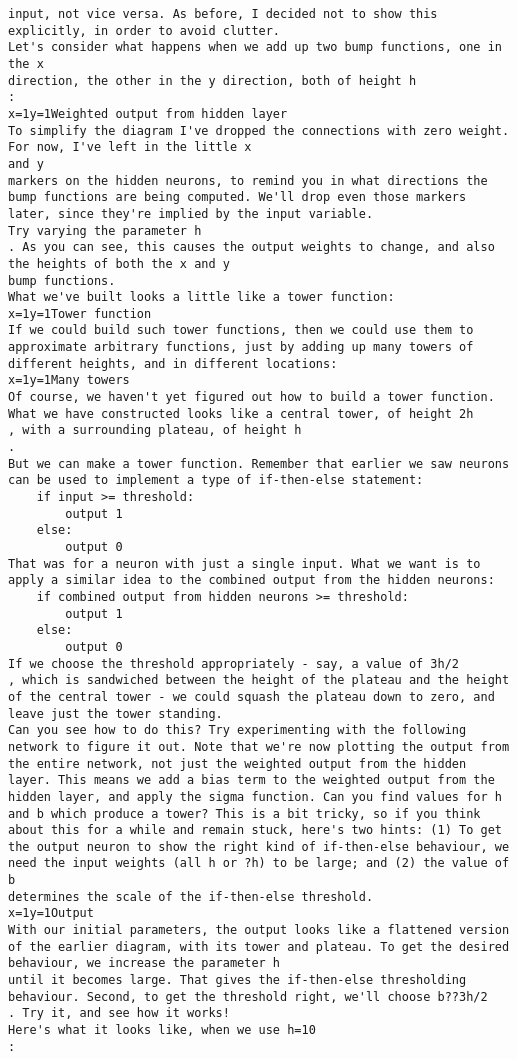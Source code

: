 \begin{lstlisting}
input, not vice versa. As before, I decided not to show this explicitly, in order to avoid clutter.
Let's consider what happens when we add up two bump functions, one in the x
direction, the other in the y direction, both of height h
:
x=1y=1Weighted output from hidden layer
To simplify the diagram I've dropped the connections with zero weight. For now, I've left in the little x
and y
markers on the hidden neurons, to remind you in what directions the bump functions are being computed. We'll drop even those markers later, since they're implied by the input variable.
Try varying the parameter h
. As you can see, this causes the output weights to change, and also the heights of both the x and y
bump functions.
What we've built looks a little like a tower function:
x=1y=1Tower function 
If we could build such tower functions, then we could use them to approximate arbitrary functions, just by adding up many towers of different heights, and in different locations:
x=1y=1Many towers 
Of course, we haven't yet figured out how to build a tower function. What we have constructed looks like a central tower, of height 2h
, with a surrounding plateau, of height h
.
But we can make a tower function. Remember that earlier we saw neurons can be used to implement a type of if-then-else statement:
    if input >= threshold: 
        output 1
    else:
        output 0
That was for a neuron with just a single input. What we want is to apply a similar idea to the combined output from the hidden neurons:
    if combined output from hidden neurons >= threshold:
        output 1
    else:
        output 0
If we choose the threshold appropriately - say, a value of 3h/2
, which is sandwiched between the height of the plateau and the height of the central tower - we could squash the plateau down to zero, and leave just the tower standing.
Can you see how to do this? Try experimenting with the following network to figure it out. Note that we're now plotting the output from the entire network, not just the weighted output from the hidden layer. This means we add a bias term to the weighted output from the hidden layer, and apply the sigma function. Can you find values for h
and b which produce a tower? This is a bit tricky, so if you think about this for a while and remain stuck, here's two hints: (1) To get the output neuron to show the right kind of if-then-else behaviour, we need the input weights (all h or ?h) to be large; and (2) the value of b
determines the scale of the if-then-else threshold.
x=1y=1Output
With our initial parameters, the output looks like a flattened version of the earlier diagram, with its tower and plateau. To get the desired behaviour, we increase the parameter h
until it becomes large. That gives the if-then-else thresholding behaviour. Second, to get the threshold right, we'll choose b??3h/2
. Try it, and see how it works!
Here's what it looks like, when we use h=10
:


\end{lstlisting}
